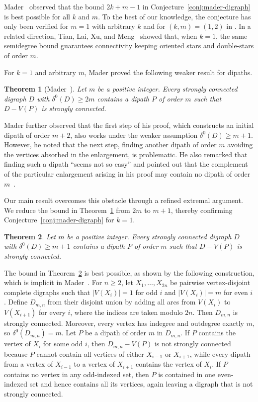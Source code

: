 \documentclass[12pt]{article}
\numberwithin{equation}{section}
\theoremstyle{plain}
\newtheorem{theorem}{Theorem}[section]
\theoremstyle{definition}
\begin{document}
Mader~\cite{Mader12} observed that the bound $2k+m-1$ in Conjecture~\ref{conj:mader-digraph} is best possible for all $k$ and $m$.
To the best of our knowledge, the conjecture has only been verified for $m=1$ with arbitrary $k$ and for $(k,m)=(1,2)$ in \cite{Mader91, Mader12}.
In a related direction, Tian, Lai, Xu, and Meng~\cite{TLXM19} showed that, when $k=1$, the same semidegree bound guarantees connectivity keeping oriented stars and double-stars of order $m$.

For $k=1$ and arbitrary $m$, Mader proved the following weaker result for dipaths.

\begin{theorem}[Mader~{\cite[Proposition~1]{Mader12}}]\label{thm:mader}
Let $m$ be a positive integer.
Every strongly connected digraph $D$ with $\delta^0(D)\ge 2m$ contains a dipath $P$ of order $m$ such that $D-V(P)$ is strongly connected.
\end{theorem}
Mader further observed that the first step of his proof, which constructs an initial dipath of order $m+2$, also works under the weaker assumption $\delta^0(D)\ge m+1$. However, he noted that the next step, finding another dipath of order $m$ avoiding the vertices absorbed in the enlargement, is problematic. He also remarked that finding such a dipath ``seems not so easy'' and pointed out that the complement of the particular enlargement arising in his proof may contain no dipath of order $m$~\cite[p.~329]{Mader12}.

Our main result overcomes this obstacle through a refined extremal argument. We reduce the bound in Theorem~\ref{thm:mader} from $2m$ to $m+1$, thereby confirming Conjecture~\ref{conj:mader-digraph} for $k=1$.

\begin{theorem}\label{thm:main}
Let $m$ be a positive integer.
Every strongly connected digraph $D$ with $\delta^0(D)\ge m+1$ contains a dipath $P$ of order $m$ such that $D-V(P)$ is strongly connected.
\end{theorem}

The bound in Theorem~\ref{thm:main} is best possible, as shown by the following construction, which is implicit in Mader~\cite{Mader12}.
For $n\ge 2$, let $X_1,\ldots,X_{2n}$ be pairwise vertex-disjoint complete digraphs such that $|V(X_i)|=1$ for odd $i$ and $|V(X_i)|=m$ for even $i$.
Define $D_{m,n}$ from their disjoint union by adding all arcs from $V(X_i)$ to $V(X_{i+1})$ for every $i$, where the indices are taken modulo $2n$.
Then $D_{m,n}$ is strongly connected.
Moreover, every vertex has indegree and outdegree exactly $m$, so $\delta^0(D_{m,n})=m$.
Let $P$ be a dipath of order $m$ in $D_{m,n}$.
If $P$ contains the vertex of $X_i$ for some odd $i$, then $D_{m,n}-V(P)$ is not strongly connected because $P$ cannot contain all vertices of either $X_{i-1}$ or $X_{i+1}$, while every dipath from a vertex of $X_{i-1}$ to a vertex of $X_{i+1}$ contains the vertex of $X_i$.
If $P$ contains no vertex in any odd-indexed set, then $P$ is contained in one even-indexed set and hence contains all its vertices, again leaving a digraph that is not strongly connected.
\end{document}
